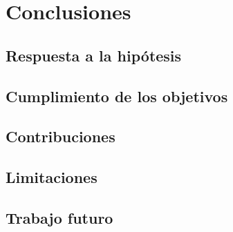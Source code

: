 \chapter{Conclusiones}
\label{cap:conclusiones}

\section{Respuesta a la hipótesis}
\section{Cumplimiento de los objetivos}
\section{Contribuciones}
\section{Limitaciones}
\section{Trabajo futuro}
